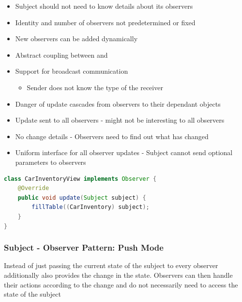 \documentclass[
    ../../Software_Engineering_Summary.tex,
]
{subfiles}
\begin{document}
\begin{itemize}
    \item Subject should not need to know details about its observers
    \item Identity and number of observers not predetermined or fixed
    \item New observers can be added dynamically
\end{itemize}

\begin{defbox}
    \begin{itemize}
        \item Abstract coupling between  and 
        \item Support for broadcast communication 
        \begin{itemize}
            \item Sender does not know the type of the receiver
        \end{itemize}
    \end{itemize}
\end{defbox}

\begin{defbox}
    \begin{itemize}
        \item Danger of update cascades from observers to their dependant objects
        \item Update sent to all observers - might not be interesting to all observers
        \item No change details - Observers need to find out what has changed
        \item Uniform interface for all observer updates - Subject cannot send optional parameters to observers
    \end{itemize}
\end{defbox}

\begin{codebox}
    \begin{lstlisting}[language=Java]
class CarInventoryView implements Observer {
    @Override
    public void update(Subject subject) {
        fillTable((CarInventory) subject);
    }
}\end{lstlisting}
\end{codebox}

\subsubsection{Subject - Observer Pattern: Push Mode}
Instead of just passing the current state of the subject to every observer additionally also provides the change in the state. Observers can then handle their actions according to the change and do not necessarily need to access the state of the subject
\end{document}

